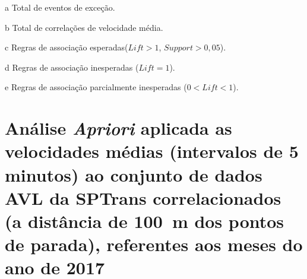 \documentclass[
	12pt,				%
	oneside,			%
	a4paper,			%
	english,			%
	brazil				%
	]{abntex2ppgsi}
\begin{document}
{{{\begin{apendicesenv}
\begin{table}[!htb]
\begin{threeparttable}
\begin{tablenotes}
            \item[a] Total de eventos de exceção.
            \item[b] Total de correlações de velocidade média.
            \item[c] Regras de associação esperadas($Lift > 1$, $Support > 0,05$).
            \item[d] Regras de associação inesperadas ($Lift = 1$).
            \item[e] Regras de associação parcialmente inesperadas ($0 < Lift < 1$).
        \end{tablenotes}
\end{threeparttable}
\end{table}

\clearpage

\section{Análise \textit{Apriori} aplicada as velocidades médias (intervalos de 5 minutos) ao conjunto de dados AVL da SPTrans correlacionados (a distância de 100~m dos pontos de parada), referentes aos meses do ano de 2017}
\label{g3}


\end{apendicesenv}}}}
\end{document}
